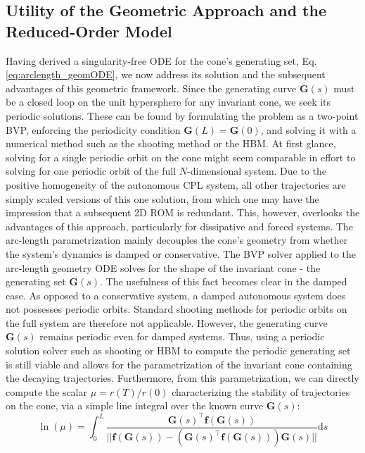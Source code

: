\documentclass[a4paper,9pt,parskip=half,english]{article}
\theoremstyle{plain}
\theoremstyle{definition}
\newcommand{\diff}[1][]{\mathrm{d}#1}
\newcommand{\T}{^{\!\top}} %
\newcommand{\vf}{\mathbf f}
\newcommand{\vG}{\mathbf G}
\begin{document}
\subsection{Utility of the Geometric Approach and the Reduced-Order Model}
Having derived a singularity-free ODE for the cone's generating set, Eq. \eqref{eq:arclength_geomODE}, we now address its solution and the subsequent advantages of this geometric framework. Since the generating curve $\vG(s)$ must be a closed loop on the unit hypersphere for any invariant cone, we seek its periodic solutions. These can be found by formulating the problem as a two-point BVP, enforcing the periodicity condition $\vG(L)=\vG(0)$, and solving it with a numerical method such as the shooting method or the HBM.
At first glance, solving for a single periodic orbit on the cone might seem comparable in effort to solving for one periodic orbit of the full $N$-dimensional system. Due to the positive homogeneity of the autonomous CPL system, all other trajectories are simply scaled versions of this one solution, from which one may have the impression that a subsequent 2D ROM is redundant. This, however, overlooks the advantages of this approach, particularly for dissipative and forced systems.
The arc-length parametrization mainly decouples the cone's geometry from whether the system's dynamics is damped or conservative. The BVP solver applied to the arc-length geometry ODE solves for the shape of the invariant cone - the generating set $\vG(s)$. The usefulness of this fact becomes clear in the damped case. As opposed to a conservative system, a damped autonomous system does not possesses periodic orbits. Standard shooting methods for periodic orbits on the full system are therefore not applicable. However, the generating curve $\vG(s)$ remains periodic even for damped systems. Thus, using a periodic solution solver such as shooting or HBM to compute the periodic generating set is still viable and allows for the parametrization of the invariant cone containing the decaying trajectories. Furthermore, from this parametrization, we can directly compute the scalar $\mu= r(T)/r(0)$ characterizing the stability of trajectories on the cone, via a simple line integral over the known curve $\vG(s)$: 
\begin{equation}\label{eq:mu_integral}
	\ln(\mu) = \int_0^L \frac{\vG(s)\T \vf(\vG(s))}{||\vf(\vG(s)) - \left( \vG(s)\T \vf(\vG(s)) \right)\vG(s)||} \diff{s}
\end{equation}
\end{document}
